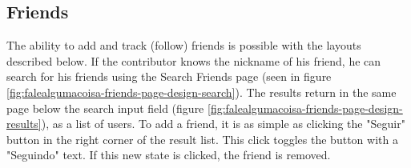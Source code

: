 \subsection{Friends}

The ability to add and track (follow) friends is possible with the layouts described below. If the contributor knows the nickname of his friend, he can search for his friends using the Search Friends page (seen in figure \ref{fig:falealgumacoisa-friends-page-design-search}). The results return in the same page below the search input field (figure \ref{fig:falealgumacoisa-friends-page-design-results}), as a list of users. To add a friend, it is as simple as clicking the "Seguir" button in the right corner of the result list. This click toggles the button with a "Seguindo" text. If this new state is clicked, the friend is removed.

